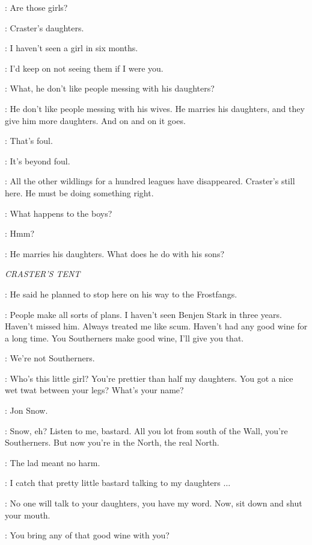 \SAM: Are those girls?

\EDD: Craster's daughters.

\SAM: I haven't seen a girl in six months.

\EDD: I'd keep on not seeing them if I were you.

\GRENN: What, he don't like people messing with his daughters?

\EDD: He don't like people messing with his wives. He marries his daughters, and they give him more daughters. And on and on it goes.

\SAM: That's foul.

\GRENN: It's beyond foul.

\EDD: All the other wildlings for a hundred leagues have disappeared. Craster's still here. He must be doing something right.

\JON: What happens to the boys?

\EDD: Hmm?

\JON: He marries his daughters. What does he do with his sons?


\scene

\textit{CRASTER'S TENT}


\JEOR: He said he planned to stop here on his way to the Frostfangs.

\CRASTER: People make all sorts of plans. I haven't seen Benjen Stark in three years. Haven't missed him. Always treated me like scum. Haven't had any good wine for a long time. You Southerners make good wine, I'll give you that.

\JON: We're not Southerners.

\CRASTER: Who's this little girl? You're prettier than half my daughters. You got a nice wet twat between your legs? What's your name?

\JON: Jon Snow.

\CRASTER: Snow, eh? Listen to me, bastard. All you lot from south of the Wall, you're Southerners. But now you're in the North, the real North.

\JEOR: The lad meant no harm.

\CRASTER: I catch that pretty little bastard talking to my daughters $\ldots$

\JEOR: No one will talk to your daughters, you have my word.  Now, sit down and shut your mouth.

\CRASTER: You bring any of that good wine with you?

